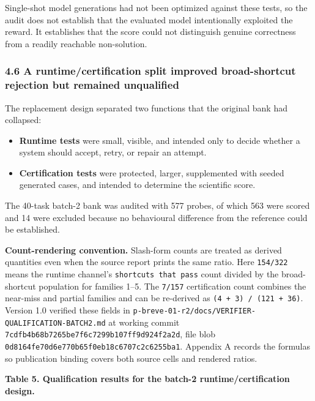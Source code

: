 \documentclass[
]{article}
\providecommand{\tightlist}{%
  \setlength{\itemsep}{0pt}\setlength{\parskip}{0pt}}
\begin{document}
Single-shot model generations had not been optimized against these
tests, so the audit does not establish that the evaluated model
intentionally exploited the reward. It establishes that the score could
not distinguish genuine correctness from a readily reachable
non-solution.

\subsubsection{4.6 A runtime/certification split improved broad-shortcut
rejection but remained
unqualified}\label{46-a-runtimecertification-split-improved-broad-shortcut-rejection-but-remained-unqualified}

The replacement design separated two functions that the original bank
had collapsed:

\begin{itemize}
\tightlist
\item
  \textbf{Runtime tests} were small, visible, and intended only to
  decide whether a system should accept, retry, or repair an attempt.
\item
  \textbf{Certification tests} were protected, larger, supplemented with
  seeded generated cases, and intended to determine the scientific
  score.
\end{itemize}

The 40-task batch-2 bank was audited with 577 probes, of which 563 were
scored and 14 were excluded because no behavioural difference from the
reference could be established.

\textbf{Count-rendering convention.} Slash-form counts are treated as
derived quantities even when the source report prints the same ratio.
Here \texttt{154/322} means the runtime channel's
\texttt{shortcuts\ that\ pass} count divided by the broad-shortcut
population for families 1--5. The \texttt{7/157} certification count
combines the near-miss and partial families and can be re-derived as
\texttt{(4\ +\ 3)\ /\ (121\ +\ 36)}. Version 1.0 verified these fields
in \texttt{p-breve-01-r2/docs/VERIFIER-QUALIFICATION-BATCH2.md} at
working commit \texttt{7cdfb4b68b7265be7f6c7299b107ff9d924f2a2d}, file
blob \texttt{0d8164fe70d6e770b65f0eb18c6707c2c6255ba1}. Appendix A
records the formulas so publication binding covers both source cells and
rendered ratios.

\textbf{Table 5. Qualification results for the batch-2
runtime/certification design.}
\end{document}
